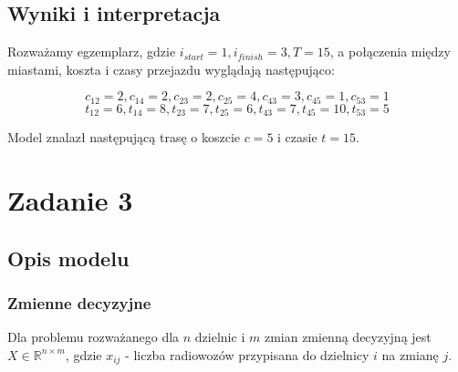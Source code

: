 \documentclass{article}
\begin{document}
\subsection{Wyniki i interpretacja}
Rozważamy egzemplarz, gdzie $i_{start}=1, i_{finish}=3, T=15$, a połączenia między miastami, koszta i czasy przejazdu wyglądają następująco:
\begin{center}
\end{center}
\[c_{12}=2, c_{14}=2, c_{23}=2, c_{25}=4, c_{43}=3, c_{45}=1, c_{53}=1\]
\[t_{12}=6, t_{14}=8, t_{23}=7, t_{25} =6, t_{43}=7, t_{45}=10, t_{53}=5\]

Model znalazł następującą trasę o koszcie \(c=5\) i czasie \(t=15\).
\begin{center}
\end{center}

\section{Zadanie 3}
\subsection{Opis modelu}
\subsubsection{Zmienne decyzyjne}
Dla problemu rozważanego dla \(n\) dzielnic i \(m\) zmian zmienną decyzyjną jest \(X\in\mathbb{R}^{n \times m}\),
gdzie \(x_{ij}\) - liczba radiowozów przypisana do dzielnicy \(i\) na zmianę \(j\).
\end{document}
